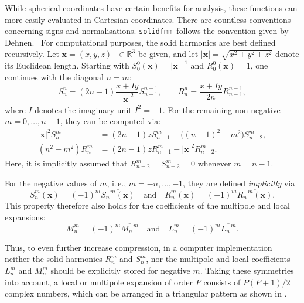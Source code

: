 \documentclass{scrbook}
\newcommand{\solidfmm}{\texttt{solidfmm}}
\newcommand{\reals}{\ensuremath{\mathbb{R}}}
\newcommand{\wholespace}{\ensuremath{\reals^3}}
\newcommand{\vv}[1]{\ensuremath{\symbf{#1}}} %
\begin{document}
While spherical coordinates have certain benefits for analysis, these functions
can more easily evaluated in Cartesian coordinates. There are countless
conventions concerning signs and normalisations. \solidfmm\ follows the
convention given by Dehnen.~\autocite{dehnen2014} For computational purposes,
the solid harmonics are best defined recursively. Let
$\vv{x}=(x,y,z)^\top\in\wholespace$ be given, and let
$|\vv{x}|=\sqrt{x^2+y^2+z^2}$ denote its Euclidean length. Starting
with $S_0^0(\vv{x})=|\vv{x}|^{-1}$ and $R_0^0(\vv{x})=1$, one continues with
the diagonal $n=m$:
\begin{equation}
S_n^n = (2n-1)\frac{x+Iy}{|\vv{x}|^2}S_{n-1}^{n-1},\qquad
R_n^n =       \frac{x+Iy}{2n}R_{n-1}^{n-1},
\end{equation}
where $I$ denotes the imaginary unit $I^2=-1$. For the remaining non-negative
$m=0,\dotsc,n-1$, they can be computed via:
\begin{equation}
\begin{split}
|\vv{x}|^2 S_n^m    &= (2n-1)zS_{n-1}^m-\bigl((n-1)^2-m^2\bigr)S_{n-2}^m,\\
(n^2-m^2)R_n^m &= (2n-1)zR_{n-1}^m - |\vv{x}|^2R_{n-2}^m.
\end{split}
\end{equation}
Here, it is implicitly assumed that $R_{n-2}^m=S_{n-2}^m=0$ whenever $m=n-1$.

For the negative values of $m$, i.\,e., $m=-n,\dotsc,-1$, they are defined
\emph{implicitly} via
\begin{equation}\label{eqn:negativem}
S_n^m(\vv{x}) = (-1)^m\overline{S_n^{-m}(\vv{x})}
\quad\text{and}\quad
R_n^m(\vv{x}) = (-1)^m\overline{R_n^{-m}(\vv{x})}.
\end{equation}
This property therefore also holds for the coefficients of the multipole and
local expansions:
\begin{equation}\label{eqn:negativemcoeffs}
M_n^m = (-1)^m\overline{M_n^{-m}}
\quad\text{and}\quad
L_n^m = (-1)^m\overline{L_n^{-m}}.
\end{equation}

Thus, to even further increase compression, in a computer implementation
neither the solid harmonics $R_n^m$ and $S_n^m$, nor the multipole and local
coefficients $L_n^m$ and $M_n^m$ should be explicitly stored for negative $m$.
Taking these symmetries into account, a local or multipole expansion
of order $P$ consists of $P(P+1)/2$ complex numbers, which can be arranged
in a triangular pattern as shown in .
\end{document}
